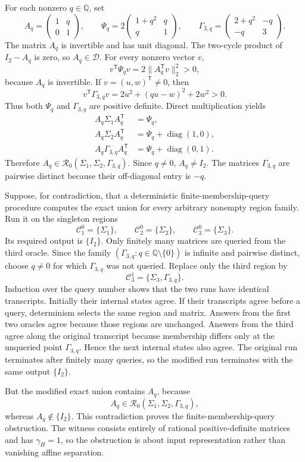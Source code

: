 For each nonzero \(q\in\mathbb Q\), set
\[
A_q=\begin{pmatrix}1&q\\0&1\end{pmatrix},
\qquad
\Psi_q=2\begin{pmatrix}1+q^2&q\\q&1\end{pmatrix},
\qquad
\Gamma_{3,q}=\begin{pmatrix}2+q^2&-q\\-q&3\end{pmatrix}.
\]
The matrix \(A_q\) is invertible and has unit diagonal. The two-cycle product of \(I_2-A_q\) is zero, so \(A_q\in\mathcal D\). For every nonzero vector \(v\),
\[
v^{\mathsf T}\Psi_qv=2\|A_q^{\mathsf T}v\|_2^2>0,
\]
because \(A_q\) is invertible. If \(v=(u,w)^{\mathsf T}\neq0\), then
\[
v^{\mathsf T}\Gamma_{3,q}v
=2u^2+(qu-w)^2+2w^2>0.
\]
Thus both \(\Psi_q\) and \(\Gamma_{3,q}\) are positive definite. Direct multiplication yields
\[
\begin{aligned}
A_q\Sigma_1A_q^{\mathsf T}&=\Psi_q,\\
A_q\Sigma_2A_q^{\mathsf T}&=\Psi_q+\operatorname{diag}(1,0),\\
A_q\Gamma_{3,q}A_q^{\mathsf T}&=\Psi_q+\operatorname{diag}(0,1).
\end{aligned}
\]
Therefore \(A_q\in\mathcal R_0(\Sigma_1,\Sigma_2,\Gamma_{3,q})\). Since \(q\neq0\), \(A_q\neq I_2\). The matrices \(\Gamma_{3,q}\) are pairwise distinct because their off-diagonal entry is \(-q\).

Suppose, for contradiction, that a deterministic finite-membership-query procedure computes the exact union for every arbitrary nonempty region family. Run it on the singleton regions
\[
\mathcal C^0_1=\{\Sigma_1\},\qquad
\mathcal C^0_2=\{\Sigma_2\},\qquad
\mathcal C^0_3=\{\Sigma_3\}.
\]
Its required output is \(\{I_2\}\). Only finitely many matrices are queried from the third oracle. Since the family \((\Gamma_{3,q}:q\in\mathbb Q\setminus\{0\})\) is infinite and pairwise distinct, choose \(q\neq0\) for which \(\Gamma_{3,q}\) was not queried. Replace only the third region by
\[
\mathcal C^1_3=\{\Sigma_3,\Gamma_{3,q}\}.
\]
Induction over the query number shows that the two runs have identical transcripts. Initially their internal states agree. If their transcripts agree before a query, determinism selects the same region and matrix. Answers from the first two oracles agree because those regions are unchanged. Answers from the third agree along the original transcript because membership differs only at the unqueried point \(\Gamma_{3,q}\). Hence the next internal states also agree. The original run terminates after finitely many queries, so the modified run terminates with the same output \(\{I_2\}\).

But the modified exact union contains \(A_q\), because
\[
A_q\in\mathcal R_0(\Sigma_1,\Sigma_2,\Gamma_{3,q}),
\]
whereas \(A_q\notin\{I_2\}\). This contradiction proves the finite-membership-query obstruction. The witness consists entirely of rational positive-definite matrices and has \(\gamma_H=1\), so the obstruction is about input representation rather than vanishing affine separation.